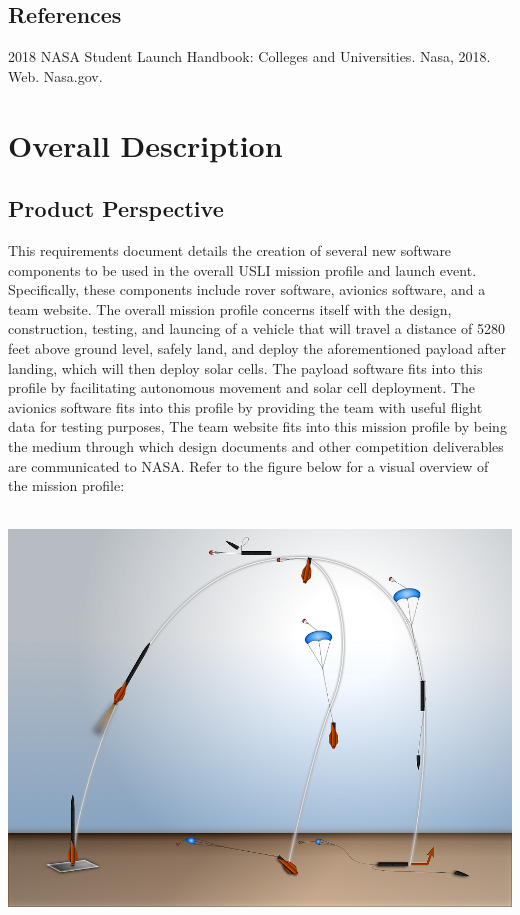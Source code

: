 \documentclass[onecolumn, draftclsnofoot, 10pt, compsoc]{IEEEtran}
\begin{document}
\subsection{References}
2018 NASA Student Launch Handbook: Colleges and Universities. Nasa, 2018. Web. Nasa.gov.

\section{Overall Description}

\subsection{Product Perspective}
This requirements document details the creation of several new software components to be used in the overall USLI mission profile and launch event. Specifically, these components include rover software, avionics software, and a team website. The overall mission profile concerns itself with the design, construction, testing, and launcing of a vehicle that will travel a distance of 5280 feet above ground level, safely land, and deploy the aforementioned payload after landing, which will then deploy solar cells. The payload software fits into this profile by facilitating autonomous movement and solar cell deployment. The avionics software fits into this profile by providing the team with useful flight data for testing purposes, The team website fits into this mission profile by being the medium through which design documents and other competition deliverables are communicated to NASA. Refer to the figure below for a visual overview of the mission profile:\\ \\
\begin{minipage}{\linewidth}
\begin{center}
\includegraphics[width=\textwidth]{mission-profile}
\end{center}
\end{minipage}
\end{document}
